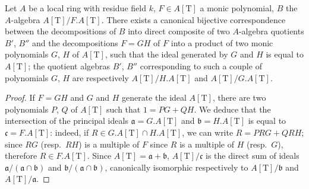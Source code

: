 \begin{lemma}[18.5.13.1]
\label{IV.18.5.13.1}
Let $A$ be a local ring with residue field $k$, $F\in A[\mathrm{T}]$ a monic polynomial, $B$ the $A$-algebra $A[\mathrm{T}]/F.A[\mathrm{T}]$.
There exists a canonical bijective correspondence between the decompositions of $B$ into direct composite of two $A$-algebra quotients $B'$, $B''$ and the decompositions $F=GH$ of $F$ into a product of two monic polynomials $G$, $H$ of $A[\mathrm{T}]$, such that the ideal generated by $G$ and $H$ is equal to $A[\mathrm{T}]$;
the quotient algebras $B'$, $B''$ corresponding to such a couple of polynomials $G$, $H$ are respectively $A[\mathrm{T}]/H.A[\mathrm{T}]$ and $A[\mathrm{T}]/G.A[\mathrm{T}]$.
\end{lemma}

\begin{proof}
If $F=GH$ and $G$ and $H$ generate the ideal $A[\mathrm{T}]$, there are two polynomials $P$, $Q$ of $A[\mathrm{T}]$ such that $1=PG+QH$.
We deduce that the intersection of the principal ideals $\mathfrak{a}=G.A[\mathrm{T}]$ and $\mathfrak{b}=H.A[\mathrm{T}]$ is equal to $\mathfrak{c}=F.A[\mathrm{T}]$:
indeed, if $R\in G.A[\mathrm{T}]\cap H.A[\mathrm{T}]$, we can write $R=PRG+QRH$;
since $RG$ (resp.\ $RH$) is a multiple of $F$ since $R$ is a multiple of $H$ (resp.\ $G$), therefore $R\in F.A[\mathrm{T}]$.
Since $A[\mathrm{T}]=\mathfrak{a}+\mathfrak{b}$, $A[\mathrm{T}]/\mathfrak{c}$ is the direct sum of ideals $\mathfrak{a}/(\mathfrak{a}\cap\mathfrak{b})$ and $\mathfrak{b}/(\mathfrak{a}\cap\mathfrak{b})$, canonically isomorphic respectively to $A[\mathrm{T}]/\mathfrak{b}$ and $A[\mathrm{T}]/\mathfrak{a}$.


\end{proof}
